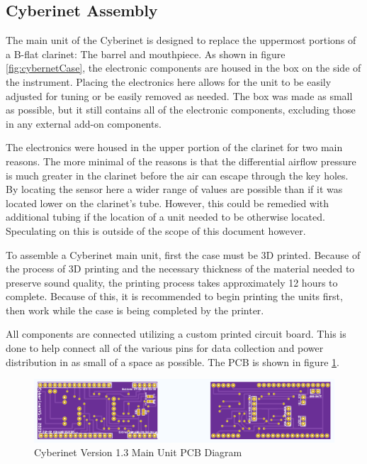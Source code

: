 \subsection{Cyberinet Assembly}

The main unit of the Cyberinet is designed to replace the uppermost portions of a B-flat clarinet: The barrel and mouthpiece. As shown in figure \ref{fig:cybernetCase}, the electronic components are housed in the box on the side of the instrument. Placing the electronics here allows for the unit to be easily adjusted for tuning or be easily removed as needed. The box was made as small as possible, but it still contains all of the electronic components, excluding those in any external add-on components. 

The electronics were housed in the upper portion of the clarinet for two main reasons. The more minimal of the reasons is that the differential airflow pressure is much greater in the clarinet before the air can escape through the key holes. By locating the sensor here a wider range of values are possible than if it was located lower on the clarinet's tube. However, this could be remedied with additional tubing if the location of a unit needed to be otherwise located. Speculating on this is outside of the scope of this document however.

To assemble a Cyberinet main unit, first the case must be 3D printed. Because of the process of 3D printing and the necessary thickness of the material needed to preserve sound quality, the printing process takes approximately 12 hours to complete. Because of this, it is recommended to begin printing the units first, then work while the case is being completed by the printer.

All components are connected utilizing a custom printed circuit board. This is done to help connect all of the various pins for data collection and power distribution in as small of a space as possible. The PCB is shown in figure \ref{fig:mainUnitPCB}.

\begin{center}
    \begin{figure}
        \centering
        \includegraphics[scale=0.6]{diagrams/PCBs/cyberinetPCB.png}
        \caption{Cyberinet Version 1.3  Main Unit PCB Diagram}
        \label{fig:mainUnitPCB}
    \end{figure}
\end{center}

